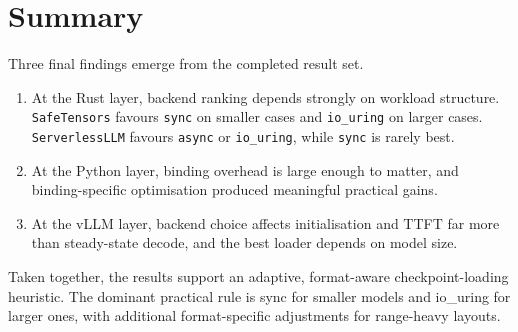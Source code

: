 \section{Summary}

Three final findings emerge from the completed result set.

\begin{enumerate}
\item At the Rust layer, backend ranking depends strongly on workload structure. \texttt{SafeTensors} favours \texttt{sync} on smaller cases and \texttt{io\_uring} on larger cases. \texttt{ServerlessLLM} favours \texttt{async} or \texttt{io\_uring}, while \texttt{sync} is rarely best.
\item At the Python layer, binding overhead is large enough to matter, and binding-specific optimisation produced meaningful practical gains.
\item At the vLLM layer, backend choice affects initialisation and TTFT far more than steady-state decode, and the best loader depends on model size.
\end{enumerate}

Taken together, the results support an adaptive, format-aware checkpoint-loading heuristic. The dominant practical rule is sync for smaller models and io\_uring for larger ones, with additional format-specific adjustments for range-heavy layouts.
